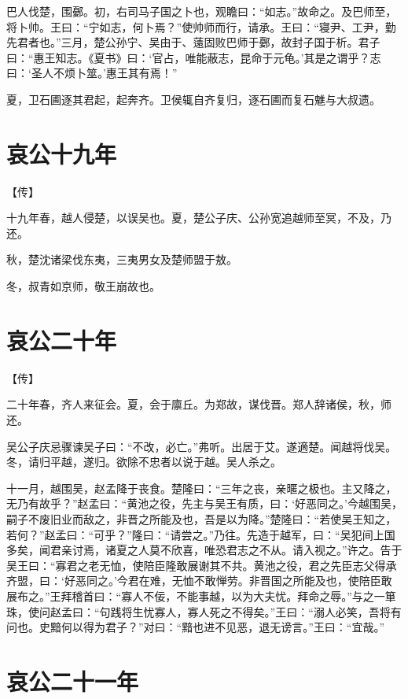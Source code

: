 \documentclass[a4paper,12pt,UTF8,twoside]{ctexbook}
\begin{document}
巴人伐楚，围鄾。初，右司马子国之卜也，观瞻曰：“如志。”故命之。及巴师至，将卜帅。王曰：“宁如志，何卜焉？”使帅师而行，请承。王曰：“寝尹、工尹，勤先君者也。”三月，楚公孙宁、吴由于、薳固败巴师于鄾，故封子国于析。君子曰：“惠王知志。《夏书》曰：‘官占，唯能蔽志，昆命于元龟。’其是之谓乎？志曰：‘圣人不烦卜筮。’惠王其有焉！”

夏，卫石圃逐其君起，起奔齐。卫侯辄自齐复归，逐石圃而复石魋与大叔遗。


\chapter{哀公十九年}


【传】

十九年春，越人侵楚，以误吴也。夏，楚公子庆、公孙宽追越师至冥，不及，乃还。

秋，楚沈诸梁伐东夷，三夷男女及楚师盟于敖。

冬，叔青如京师，敬王崩故也。



\chapter{哀公二十年}


【传】

二十年春，齐人来征会。夏，会于廪丘。为郑故，谋伐晋。郑人辞诸侯，秋，师还。

吴公子庆忌骤谏吴子曰：“不改，必亡。”弗听。出居于艾。遂適楚。闻越将伐吴。冬，请归平越，遂归。欲除不忠者以说于越。吴人杀之。

十一月，越围吴，赵孟降于丧食。楚隆曰：“三年之丧，亲暱之极也。主又降之，无乃有故乎？”赵孟曰：“黄池之役，先主与吴王有质，曰：‘好恶同之。’今越围吴，嗣子不废旧业而敌之，非晋之所能及也，吾是以为降。”楚隆曰：“若使吴王知之，若何？”赵孟曰：“可乎？”隆曰：“请尝之。”乃往。先造于越军，曰：“吴犯间上国多矣，闻君亲讨焉，诸夏之人莫不欣喜，唯恐君志之不从。请入视之。”许之。告于吴王曰：“寡君之老无恤，使陪臣隆敢展谢其不共。黄池之役，君之先臣志父得承齐盟，曰：‘好恶同之。’今君在难，无恤不敢惮劳。非晋国之所能及也，使陪臣敢展布之。”王拜稽首曰：“寡人不佞，不能事越，以为大夫忧。拜命之辱。”与之一箪珠，使问赵孟曰：“句践将生忧寡人，寡人死之不得矣。”王曰：“溺人必笑，吾将有问也。史黯何以得为君子？”对曰：“黯也进不见恶，退无谤言。”王曰：“宜哉。”


\chapter{哀公二十一年}
\end{document}
